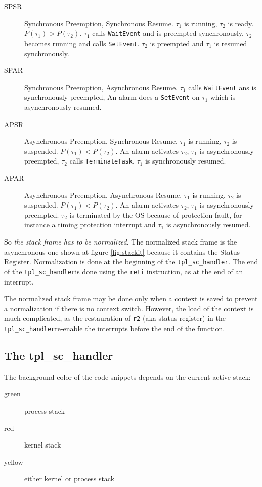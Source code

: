 \documentclass[11pt, oneside]{article}   	%
\newcommand{\sch}{\lstinline{tpl_sc_handler}}
\begin{document}
\begin{description}

\item[SPSR] Synchronous Preemption, Synchronous Resume. $\tau_1$ is running, $\tau_2$ is ready. $P(\tau_1) > P(\tau_2)$.
$\tau_1$ calls \lstinline{WaitEvent} and is preempted synchronously, $\tau_2$ becomes running and  calls \lstinline{SetEvent}. $\tau_2$ is preempted and $\tau_1$ is resumed synchronously.

\item[SPAR] Synchronous Preemption, Asynchronous Resume. $\tau_1$ calls \lstinline{WaitEvent} ans is synchronously preempted, An alarm does a \lstinline{SetEvent} on $\tau_1$ which is asynchronously resumed.

\item[APSR] Asynchronous Preemption, Synchronous Resume. $\tau_1$ is running, $\tau_2$ is suspended. $P(\tau_1) < P(\tau_2)$. An alarm activates $\tau_2$, $\tau_1$ is asynchronously preempted, $\tau_2$ calls \lstinline{TerminateTask}, $\tau_1$ is synchronously resumed.

\item[APAR] Asynchronous Preemption, Asynchronous Resume. $\tau_1$ is running, $\tau_2$ is suspended. $P(\tau_1) < P(\tau_2)$. An alarm activates $\tau_2$, $\tau_1$ is asynchronously preempted. $\tau_2$ is terminated by the OS because of protection fault, for instance a timing protection interrupt and $\tau_1$ is asynchronously resumed.

\end{description}

So \emph{the stack frame has to be normalized}. The normalized stack frame is the asynchronous one shown at figure \ref{fig:stackit} because it contains the Status Register. Normalization is done at the beginning of the \sch. The end of the \sch is done using the \texttt{reti} instruction, as at the end of an interrupt.

The normalized stack frame may be done only when a context is saved to prevent a normalization if there is no context switch. However, the load of the context is much complicated, as the restauration of \texttt{r2} (aka status register) in the \sch re-enable the interrupts before the end of the function.

\subsection{The tpl\_sc\_handler}

The background color of the code snippets depends on the current active stack:
\begin{description}
	\item[green] process stack
	\item[red]   kernel stack
	\item[yellow] either kernel or process stack
\end{description}
\end{document}

